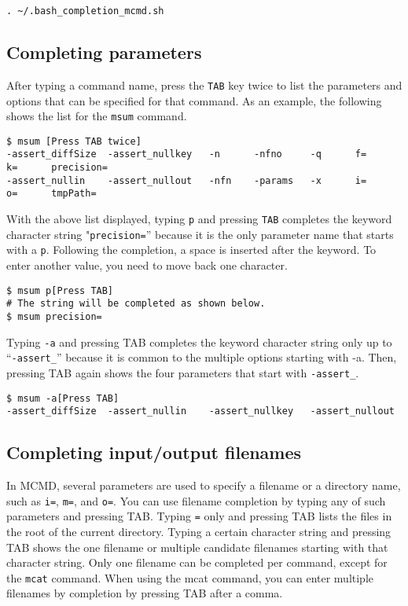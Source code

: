 \begin{Verbatim}[baselinestretch=0.7,frame=single]
. ~/.bash_completion_mcmd.sh
\end{Verbatim}

\subsection{Completing parameters\label{sect:bash_comp_param}}
After typing a command name, press the \verb|TAB| key twice to list the parameters and options that can be specified for that command. As an example, the following shows the list for the \verb|msum| command.

\begin{Verbatim}[baselinestretch=0.7,frame=single]
$ msum [Press TAB twice]
-assert_diffSize  -assert_nullkey   -n      -nfno     -q      f=      k=      precision=
-assert_nullin    -assert_nullout   -nfn    -params   -x      i=      o=      tmpPath=
\end{Verbatim}

With the above list displayed, typing \verb|p| and pressing \verb|TAB| completes the keyword character string "\verb|precision=|” because it is the only parameter name that starts with a \verb|p|.
Following the completion, a space is inserted after the keyword. To enter another value, you need to move back one character.

\begin{Verbatim}[baselinestretch=0.7,frame=single]
$ msum p[Press TAB]
# The string will be completed as shown below. 
$ msum precision= 
\end{Verbatim}

Typing \verb|-a| and pressing TAB completes the keyword character string only up to “\verb|-assert_|” because it is common to the multiple options starting with -a. Then, pressing TAB again shows the four parameters that start with \verb|-assert_|.

\begin{Verbatim}[baselinestretch=0.7,frame=single]
$ msum -a[Press TAB]
-assert_diffSize  -assert_nullin    -assert_nullkey   -assert_nullout   
\end{Verbatim}

\subsection{Completing input/output filenames\label{sect:bash_comp_file}}
In MCMD, several parameters are used to specify a filename or a directory name, such as \verb|i=|, \verb|m=|, and \verb|o=|. You can use filename completion by typing any of such parameters and pressing TAB. Typing \verb|=| only and pressing TAB lists the files in the root of the current directory. Typing a certain character string and pressing TAB shows the one filename or multiple candidate filenames starting with that character string.
Only one filename can be completed per command, except for the \verb|mcat| command. When using the mcat command, you can enter multiple filenames by completion by pressing TAB after a comma.

